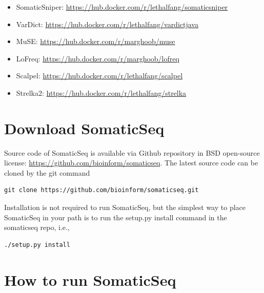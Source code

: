 \documentclass[10pt,letterpaper]{article}
\begin{document}
\begin{sloppypar}
\begin{itemize}
  \item SomaticSniper: \href{https://hub.docker.com/r/lethalfang/somaticsniper}{https://hub.docker.com/r/lethalfang/somaticsniper}

  \item VarDict:       \href{https://hub.docker.com/r/lethalfang/vardictjava}{https://hub.docker.com/r/lethalfang/vardictjava}

  \item MuSE:          \href{https://hub.docker.com/r/marghoob/muse}{https://hub.docker.com/r/marghoob/muse}

  \item LoFreq:        \href{https://hub.docker.com/r/marghoob/lofreq}{https://hub.docker.com/r/marghoob/lofreq}

  \item Scalpel:       \href{https://hub.docker.com/r/lethalfang/scalpel}{https://hub.docker.com/r/lethalfang/scalpel}

  \item Strelka2:      \href{https://hub.docker.com/r/lethalfang/strelka}{https://hub.docker.com/r/lethalfang/strelka}

\end{itemize}


\section{Download SomaticSeq} \label{download_somaticseq}

Source code of SomaticSeq is available via Github repository in BSD open-source license: \href{https://github.com/bioinform/somaticseq}{https://github.com/bioinform/somaticseq}. The latest source code can be cloned by the git command

\begin{lstlisting}
git clone https://github.com/bioinform/somaticseq.git
\end{lstlisting}

Installation is not required to run SomaticSeq, but the simplest way to place SomaticSeq in your path is to run the setup.py install command in the somaticseq repo, i.e., 

\begin{lstlisting}
./setup.py install
\end{lstlisting}



\section{How to run SomaticSeq} \label{Wrapper_script}


\end{sloppypar}
\end{document}
